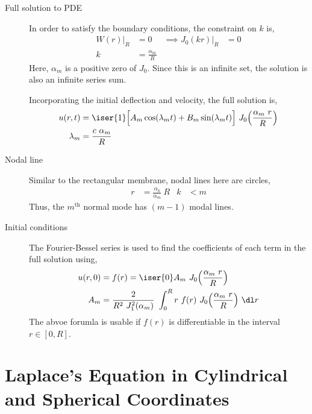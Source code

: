 \begin{description}
    \item[Full solution to PDE] In order to satisfy the boundary conditions, the
        constraint on $ k $ is,
        \begin{align}
            W(r)\Big|_{R} & = 0                  & \implies J_0(kr) \Big|_{R} & = 0 \\
            k             & = \frac{\alpha_m}{R}
        \end{align}
        Here, $ \alpha_m $ is a positive zero of $ J_0 $. Since this is an infinite set,
        the solution is also an infinite series sum. \par
        Incorporating the initial deflection and velocity, the full solution is,
        \begin{align}
            u(r, t)   & = \iser{1} \Big[ A_m \cos(\lambda_m t) + B_m \sin(\lambda_m t)
            \Big]\ J_0 \Big( \frac{\alpha_m\ r}{R} \Big)                               \\
            \lambda_m & = \frac{c\ \alpha_m}{R}
        \end{align}

    \item[Nodal line] Similar to the rectangular membrane, nodal lines here are
        circles,
        \begin{align}
            r & = \frac{\alpha_k}{\alpha_m}\ R & k & < m
        \end{align}
        Thus, the $ m^{\text{th}} $ normal mode has $ (m-1) $ modal lines.

    \item[Initial conditions] The Fourier-Bessel series is used to find the
        coefficients of each term in the full solution using,
        \begin{align}
            u(r, 0) & = f(r) = \iser{0} A_m\  J_0 \Big( \frac{\alpha_m\ r}{R} \Big) \\
            A_m     & = \frac{2}{R^2\ J_1^2(\alpha_m)}\ \int_{0}^{R}
            r\ f(r)\ J_0 \Big( \frac{\alpha_m\ r}{R} \Big)\ \dl r
        \end{align}
        The abvoe forumla is usable if $ f(r) $ is differentiable in the interval
        $ r \in [0, R] $.
\end{description}

\section{Laplace's Equation in Cylindrical and Spherical Coordinates}


